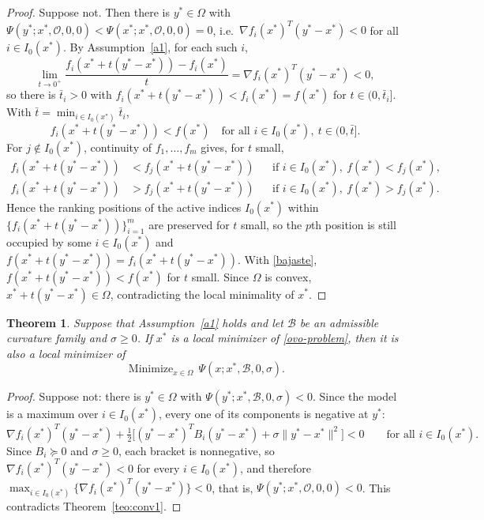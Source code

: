 \documentclass[11pt]{article}
\newcommand{\minimize}{\mathop{\text{Minimize}}}
\newtheorem{theorem}{Theorem}[section]
\begin{document}
\begin{proof}
Suppose not. Then there is $y^* \in \Omega$ with
$\Psi(y^*; x^*, \mathcal{O}, 0, 0) < \Psi(x^*; x^*, \mathcal{O}, 0, 0) = 0$, i.e.\
$\nabla f_i(x^*)^T(y^* - x^*) < 0$ for all $i \in I_0(x^*)$. By
Assumption~\ref{a1}, for each such $i$,
\[
\lim_{t \to 0^+} \frac{f_i(x^* + t(y^* - x^*)) - f_i(x^*)}{t}
= \nabla f_i(x^*)^T(y^* - x^*) < 0,
\]
so there is $\bar{t}_i > 0$ with $f_i(x^* + t(y^* - x^*)) < f_i(x^*) = f(x^*)$
for $t \in (0, \bar{t}_i]$. With $\bar{t} = \min_{i \in I_0(x^*)} \bar{t}_i$,
\begin{equation} \label{bajaste}
f_i(x^* + t(y^* - x^*)) < f(x^*) \quad
\text{for all } i \in I_0(x^*),\ t \in (0, \bar{t}].
\end{equation}
For $j \notin I_0(x^*)$, continuity of $f_1, \ldots, f_m$ gives, for $t$ small,
\begin{align}
f_i(x^* + t(y^* - x^*)) &< f_j(x^* + t(y^* - x^*))
&&\text{if } i \in I_0(x^*),\ f(x^*) < f_j(x^*), \label{arriba}\\
f_i(x^* + t(y^* - x^*)) &> f_j(x^* + t(y^* - x^*))
&&\text{if } i \in I_0(x^*),\ f(x^*) > f_j(x^*). \label{abajo}
\end{align}
Hence the ranking positions of the active indices $I_0(x^*)$ within
$\{f_i(x^* + t(y^* - x^*))\}_{i=1}^m$ are preserved for $t$ small, so the $p$th
position is still occupied by some $i \in I_0(x^*)$ and
$f(x^* + t(y^* - x^*)) = f_i(x^* + t(y^* - x^*))$. With \eqref{bajaste},
$f(x^* + t(y^* - x^*)) < f(x^*)$ for $t$ small. Since $\Omega$ is convex,
$x^* + t(y^* - x^*) \in \Omega$, contradicting the local minimality of $x^*$.
\end{proof}

\begin{theorem} \label{teo:conv2}
Suppose that Assumption~\ref{a1} holds and let $\mathcal{B}$ be an admissible
curvature family and $\sigma \geq 0$. If $x^*$ is a local minimizer of
\eqref{ovo-problem}, then it is also a local minimizer of
\[
\minimize_{x \in \Omega}\, \Psi(x; x^*, \mathcal{B}, 0, \sigma).
\]
\end{theorem}

\begin{proof}
Suppose not: there is $y^* \in \Omega$ with
$\Psi(y^*; x^*, \mathcal{B}, 0, \sigma) < 0$. Since the model is a maximum over
$i \in I_0(x^*)$, every one of its components is negative at $y^*$:
\[
\nabla f_i(x^*)^T(y^* - x^*)
+ \tfrac{1}{2} \big[ (y^* - x^*)^T B_i (y^* - x^*) + \sigma \|y^* - x^*\|^2 \big]
< 0 \qquad \text{for all } i \in I_0(x^*).
\]
Since $B_i \succeq 0$ and $\sigma \geq 0$, each bracket is nonnegative, so
$\nabla f_i(x^*)^T(y^* - x^*) < 0$ for every $i \in I_0(x^*)$, and therefore
$\max_{i \in I_0(x^*)} \{ \nabla f_i(x^*)^T(y^* - x^*) \} < 0$, that is,
$\Psi(y^*; x^*, \mathcal{O}, 0, 0) < 0$. This contradicts
Theorem~\ref{teo:conv1}.
\end{proof}
\end{document}
